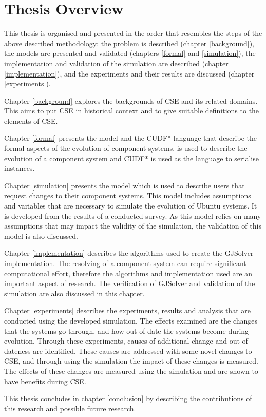 \section{Thesis Overview}
This thesis is organised and presented in the order that resembles the steps of the above described methodology:
the problem is described (chapter \ref{background}), the models are presented and validated (chapters \ref{formal} and \ref{simulation}),
the implementation and validation of the simulation are described (chapter \ref{implementation}), and the experiments and their results are discussed (chapter \ref{experiments}).  

Chapter \ref{background} explores the backgrounds of CSE and its related domains.
This aims to put CSE in historical context and to give suitable definitions to the elements of CSE.

Chapter \ref{formal} presents the \modelname model and the CUDF* language that describe the formal aspects of the evolution of component systems.
\modelname is used to describe the evolution of a component system and CUDF* is used as the language to serialise \modelname instances.

Chapter \ref{simulation} presents the \usermodel model which is used to describe users that request changes to their component systems.
This model includes assumptions and variables that are necessary to simulate the evolution of Ubuntu systems. 
It is developed from the results of a conducted survey.
As this model relies on many assumptions that may impact the validity of the simulation, the validation of this model is also discussed. 

Chapter \ref{implementation} describes the algorithms used to create the GJSolver implementation.
The resolving of a component system can require significant computational effort,
therefore the algorithms and implementation used are an important aspect of research.
The verification of GJSolver and validation of the simulation are also discussed in this chapter.

Chapter \ref{experiments} describes the experiments, results and analysis that are conducted using the developed simulation.
The effects examined are the changes that the systems go through, and how out-of-date the systems become during evolution.
Through these experiments, causes of additional change and out-of-dateness are identified.
These causes are addressed with some novel changes to CSE, and through using the simulation the impact of these changes is measured.
The effects of these changes are measured using the simulation and are shown to have benefits during CSE.

This thesis concludes in chapter \ref{conclusion} by describing the contributions of this research and possible future research.
